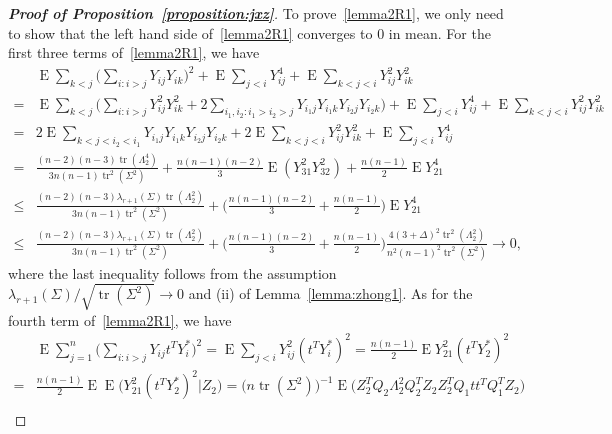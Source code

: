\documentclass[3p]{elsarticle}
\DeclareMathOperator{\mytr}{tr}
\DeclareMathOperator{\myE}{E}
\theoremstyle{plain}
\theoremstyle{definition}
\theoremstyle{remark}
\begin{document}
\begin{proof}[\textbf{Proof of Proposition~\ref{proposition:jxz}}]
To prove~\eqref{lemma2R1}, we only need to show that the left hand side of~\eqref{lemma2R1} converges to $0$ in mean.
    For the first three terms of~\eqref{lemma2R1}, we have
    \begin{equation*}
    \begin{aligned}
        &\myE\sum_{k<j}\big(\sum_{i:i>j} Y_{ij} Y_{ik}\big)^2
        +\myE\sum_{j<i}Y_{ij}^4
        +\myE\sum_{k<j<i}Y_{ij}^2 Y_{ik}^2
        \\
        =&
        \myE\sum_{k<j}\Big(\sum_{i:i>j} Y_{ij}^2 Y_{ik}^2
        +2\sum_{i_1,i_2:i_1>i_2>j} Y_{i_1 j} Y_{i_1 k} Y_{i_2 j} Y_{i_2 k}\Big)
        +\myE\sum_{j<i}Y_{ij}^4
        +\myE\sum_{k<j<i}Y_{ij}^2 Y_{ik}^2
        \\
        =&
        2\myE\sum_{k<j<i_2<i_1}Y_{i_1 j} Y_{i_1 k} Y_{i_2 j} Y_{i_2 k}
        +2\myE\sum_{k<j<i}Y_{ij}^2 Y_{ik}^2
        +\myE\sum_{j<i}Y_{ij}^4
        \\
        =&
        \frac{(n-2)(n-3) \mytr(\Lambda_2^4)}{3n(n-1)\mytr^2(\Sigma^2)}
        +\frac{n(n-1)(n-2)}{3}\myE (Y_{31}^2 Y_{32}^2)
        +\frac{n(n-1)}{2}\myE Y_{21}^4
        \\
        \leq &
        \frac{(n-2)(n-3) \lambda_{r+1}(\Sigma)\mytr(\Lambda_2^2)}{3n(n-1)\mytr^2(\Sigma^2)}
        +\Big(\frac{n(n-1)(n-2)}{3} +\frac{n(n-1)}{2}\Big)\myE Y_{21}^4
        \\
        \leq &
        \frac{(n-2)(n-3) \lambda_{r+1}(\Sigma)\mytr(\Lambda_2^2)}{3n(n-1)\mytr^2(\Sigma^2)}
        +\Big(\frac{n(n-1)(n-2)}{3} +\frac{n(n-1)}{2}\Big)
\frac{4(3+\Delta)^2\mytr^2(\Lambda_2^2)}{n^2(n-1)^2\mytr^2(\Sigma^2)}
        \to  0,
    \end{aligned}
    \end{equation*}
    where the last inequality follows from the assumption $\lambda_{r+1}(\Sigma)/\sqrt{\mytr (\Sigma^2)}\to 0$ and (ii) of Lemma~\ref{lemma:zhong1}.
    As for the fourth term of~\eqref{lemma2R1}, we have
$$
\begin{aligned}
    &\myE\sum_{j=1}^n \big(\sum_{i:i>j} Y_{ij} t^T Y_i^*\big)^2
=
    \myE\sum_{j<i} Y_{ij}^2 (t^T Y_i^{*})^2
    =
    \frac{n(n-1)}{2} \myE Y_{21}^2 (t^T Y_2^{*})^2
    \\
    =&
    \frac{n(n-1)}{2}  
    \myE \myE\big(Y_{21}^2 (t^T Y_2^{*})^2\big| Z_2\big)
    =\big(n\mytr(\Sigma^2)\big)^{-1} \myE \big( Z_2^T Q_2 \Lambda_2^2 Q_2^T Z_2 Z_2^T Q_1 t t^T Q_1^T Z_2\big) \\

\end{aligned}$$
\end{proof}
\end{document}
